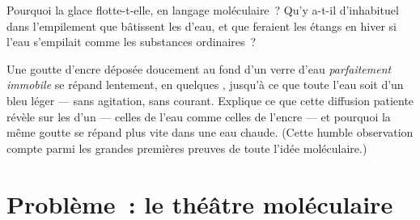 \begin{exercise}[$\star\star$]\label{exo:g7:states-of-matter:11}
Pourquoi la glace flotte-t-elle, en langage moléculaire~? Qu'y a-t-il
d'inhabituel dans l'empilement que bâtissent les  d'eau, et
que feraient les étangs en hiver si l'eau s'empilait comme les
substances ordinaires~?
\end{exercise}

\begin{exercise}[$\star\star\star$]\label{exo:g7:states-of-matter:12}
Une goutte d'encre déposée doucement au fond d'un verre d'eau
\emph{parfaitement immobile} se répand lentement, en quelques ,
jusqu'à ce que toute l'eau soit d'un bleu léger --- sans agitation,
sans courant. Explique ce que cette diffusion patiente révèle sur les
 d'un  --- celles de l'eau comme celles de
l'encre --- et pourquoi la même goutte se répand plus vite dans une
eau chaude. (Cette humble observation compte parmi les grandes
premières preuves de toute l'idée moléculaire.)
\end{exercise}

\section{Problème~: le théâtre moléculaire}

